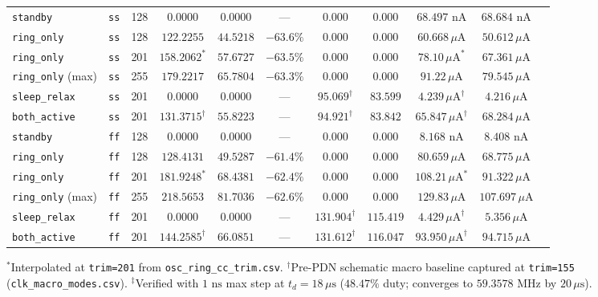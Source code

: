 \documentclass[10pt,a4paper]{article}
\begin{document}
\begin{table}[H]
\begin{tabular}{@{}llccccccccc@{}}
\midrule
\texttt{standby} & \texttt{ss} & 128 & 0.0000 & 0.0000 & --- & 0.000 & 0.000 & $68.497\text{ nA}$ & $68.684\text{ nA}$ \\
\texttt{ring\_only} & \texttt{ss} & 128 & $122.2255$ & $44.5218$ & $-63.6\%$ & 0.000 & 0.000 & $60.668\,\mu\text{A}$ & $50.612\,\mu\text{A}$ \\
\texttt{ring\_only} & \texttt{ss} & 201 & $158.2062^*$ & $57.6727$ & $-63.5\%$ & 0.000 & 0.000 & $78.10\,\mu\text{A}^*$ & $67.361\,\mu\text{A}$ \\
\texttt{ring\_only} (max) & \texttt{ss} & 255 & $179.2217$ & $65.7804$ & $-63.3\%$ & 0.000 & 0.000 & $91.22\,\mu\text{A}$ & $79.545\,\mu\text{A}$ \\
\texttt{sleep\_relax} & \texttt{ss} & 201 & 0.0000 & 0.0000 & --- & $95.069^\dagger$ & $83.599$ & $4.239\,\mu\text{A}^\dagger$ & $4.216\,\mu\text{A}$ \\
\texttt{both\_active} & \texttt{ss} & 201 & $131.3715^\dagger$ & $55.8223$ & --- & $94.921^\dagger$ & $83.842$ & $65.847\,\mu\text{A}^\dagger$ & $68.284\,\mu\text{A}$ \\
\midrule
\texttt{standby} & \texttt{ff} & 128 & 0.0000 & 0.0000 & --- & 0.000 & 0.000 & $8.168\text{ nA}$ & $8.408\text{ nA}$ \\
\texttt{ring\_only} & \texttt{ff} & 128 & $128.4131$ & $\mathbf{49.5287}$ & $-61.4\%$ & 0.000 & 0.000 & $80.659\,\mu\text{A}$ & $68.775\,\mu\text{A}$ \\
\texttt{ring\_only} & \texttt{ff} & 201 & $181.9248^*$ & $68.4381$ & $-62.4\%$ & 0.000 & 0.000 & $108.21\,\mu\text{A}^*$ & $91.322\,\mu\text{A}$ \\
\texttt{ring\_only} (max) & \texttt{ff} & 255 & $218.5653$ & $81.7036$ & $-62.6\%$ & 0.000 & 0.000 & $129.83\,\mu\text{A}$ & $107.697\,\mu\text{A}$ \\
\texttt{sleep\_relax} & \texttt{ff} & 201 & 0.0000 & 0.0000 & --- & $131.904^\dagger$ & $115.419$ & $4.429\,\mu\text{A}^\dagger$ & $5.356\,\mu\text{A}$ \\
\texttt{both\_active} & \texttt{ff} & 201 & $144.2585^\dagger$ & $66.0851$ & --- & $131.612^\dagger$ & $116.047$ & $93.950\,\mu\text{A}^\dagger$ & $94.715\,\mu\text{A}$ \\
\bottomrule
\end{tabular}
\begin{flushleft}\scriptsize $^*$Interpolated at \texttt{trim=201} from \texttt{osc\_ring\_cc\_trim.csv}. $^\dagger$Pre-PDN schematic macro baseline captured at \texttt{trim=155} (\texttt{clk\_macro\_modes.csv}). $^\ddagger$Verified with $1\text{ ns}$ max step at $t_d=18\,\mu\text{s}$ ($48.47\%$ duty; converges to $59.3578\text{ MHz}$ by $20\,\mu\text{s}$).\end{flushleft}
\end{table}
\end{document}
